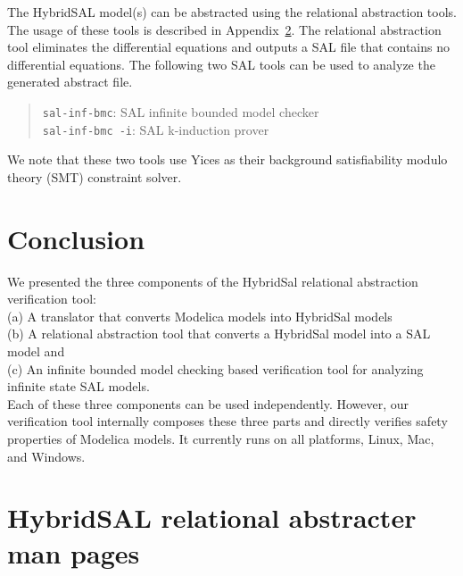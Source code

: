 \documentclass{llncs}
\begin{document}
The HybridSAL model(s) can be abstracted using the relational abstraction tools.
The usage of these tools is described in Appendix~\ref{app:1}.
The relational abstraction tool eliminates the differential equations and outputs
a SAL file that contains no differential equations.  The following two
SAL tools can be used to analyze the generated abstract file.
\begin{quote}
 {\tt{sal-inf-bmc}}: SAL infinite bounded model checker
\\
 {\tt{sal-inf-bmc -i}}:  SAL k-induction prover
\end{quote}
We note that these two tools use Yices as their background 
satisfiability modulo theory (SMT) constraint solver.

\section{Conclusion}
We presented the three components of the HybridSal relational abstraction
verification tool: 
\\
(a) A translator that converts Modelica models into HybridSal models
\\
(b) A relational abstraction tool that converts a HybridSal model into a SAL model
and
\\
(c) An infinite bounded model checking based verification tool for analyzing
infinite state SAL models.
\\
Each of these three components can be used independently. However,
our verification tool internally composes these three parts and
directly verifies safety properties of Modelica models.
It currently runs on all platforms, Linux, Mac, and Windows.







\appendix
\section{HybridSAL relational abstracter man pages}
\label{app:1}
\end{document}
